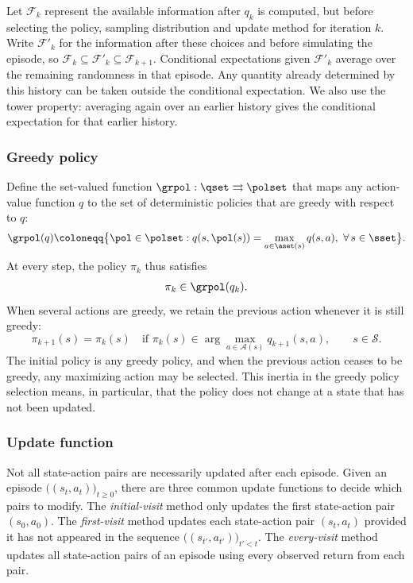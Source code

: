 Let $\mathcal F_k$ represent the available information after $q_k$ is computed, but before selecting the policy, sampling distribution and update method for iteration $k$.
Write $\mathcal F'_k$ for the information after these choices and before simulating the episode, so $\mathcal F_k\subseteq\mathcal F'_k\subseteq\mathcal F_{k+1}$.
Conditional expectations given $\mathcal F'_k$ average over the remaining randomness in that episode. Any quantity already determined by this history can be taken outside the conditional expectation. We also use the tower property: averaging again over an earlier history gives the conditional expectation for that earlier history.

\subsubsection{Greedy policy}

Define the set-valued function $\grpol : \qset \rightrightarrows \polset$ that maps any action-value function $q$ to the set of deterministic policies that are greedy with respect to $q$:
\begin{align}
\label{eq: greedy pol}
    \grpol(q) \coloneqq \big\{ \pol \in \polset : q(s, \pol(s)) = \max_{a \in \aset(s)} q(s,a), \ \forall \, s \in \sset \big\} .
\end{align}
At every step, the policy $\pi_k$ thus satisfies
\begin{align}
\label{eq: greedy policy def}
    \pi_k \in \grpol(q_k) .
\end{align}
When several actions are greedy, we retain the previous action whenever it is still greedy:
\begin{equation}
\label{eq:greedy-pol-tie-breaking}
\pi_{k+1}(s)=\pi_k(s)
\quad\text{if }\pi_k(s)\in\arg\max_{a\in\mathcal A(s)}q_{k+1}(s,a),
\qquad s\in\mathcal S.
\end{equation}
The initial policy is any greedy policy, and when the previous action ceases to be greedy, any maximizing action may be selected.
This inertia in the greedy policy selection means, in particular, that the policy does not change at a state that has not been updated.

\subsubsection{Update function}

Not all state-action pairs are necessarily updated after each episode.
Given an episode $\big( (s_t, a_t) \big)_{t \ge 0}$, there are three common update functions to decide which pairs to modify.
The \textit{initial-visit} method only updates the first state-action pair $(s_0, a_0)$.
The \textit{first-visit} method updates each state-action pair $(s_t, a_t)$ provided it has not appeared in the sequence $\big((s_{t'}, a_{t'})\big)_{t' < t}$.
The \textit{every-visit} method updates all state-action pairs of an episode using every observed return from each pair.

